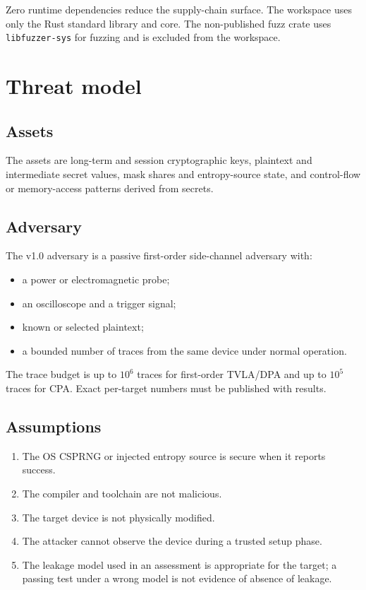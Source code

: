 \documentclass[11pt,a4paper]{article}
\newcommand{\code}[1]{\texttt{#1}}
\theoremstyle{plain}
\theoremstyle{definition}
\theoremstyle{remark}
\begin{document}
Zero runtime dependencies reduce the supply-chain surface. The workspace uses only the
Rust standard library and core. The non-published fuzz crate uses \code{libfuzzer-sys}
for fuzzing and is excluded from the workspace.

\section{Threat model}\label{sec:threat}

\subsection{Assets}

The assets are long-term and session cryptographic keys, plaintext and intermediate
secret values, mask shares and entropy-source state, and control-flow or memory-access
patterns derived from secrets.

\subsection{Adversary}

The v1.0 adversary is a passive first-order side-channel adversary with:

\begin{itemize}[leftmargin=1.5em]
  \item a power or electromagnetic probe;
  \item an oscilloscope and a trigger signal;
  \item known or selected plaintext;
  \item a bounded number of traces from the same device under normal operation.
\end{itemize}

The trace budget is up to \(10^6\) traces for first-order TVLA/DPA and up to \(10^5\)
traces for CPA. Exact per-target numbers must be published with results.

\subsection{Assumptions}

\begin{enumerate}[leftmargin=1.5em]
  \item The OS CSPRNG or injected entropy source is secure when it reports success.
  \item The compiler and toolchain are not malicious.
  \item The target device is not physically modified.
  \item The attacker cannot observe the device during a trusted setup phase.
  \item The leakage model used in an assessment is appropriate for the target; a
        passing test under a wrong model is not evidence of absence of leakage.
\end{enumerate}
\end{document}

